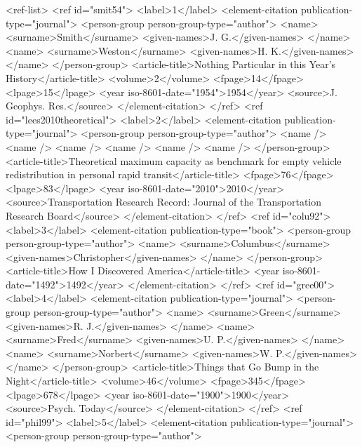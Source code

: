 <ref-list>
  <ref id="smit54">
    <label>1</label>
    <element-citation publication-type="journal">
      <person-group person-group-type="author">
        <name>
          <surname>Smith</surname>
          <given-names>J. G.</given-names>
        </name>
        <name>
          <surname>Weston</surname>
          <given-names>H. K.</given-names>
        </name>
      </person-group>
      <article-title>Nothing Particular in this Year's History</article-title>
      <volume>2</volume>
      <fpage>14</fpage>
      <lpage>15</lpage>
      <year iso-8601-date="1954">1954</year>
      <source>J. Geophys. Res.</source>
    </element-citation>
  </ref>
  <ref id="lees2010theoretical">
    <label>2</label>
    <element-citation publication-type="journal">
      <person-group person-group-type="author">
        <name />
        <name />
        <name />
        <name />
        <name />
        <name />
      </person-group>
      <article-title>Theoretical maximum capacity as benchmark for empty vehicle redistribution in personal rapid transit</article-title>
      <fpage>76</fpage>
      <lpage>83</lpage>
      <year iso-8601-date="2010">2010</year>
      <source>Transportation Research Record: Journal of the Transportation Research Board</source>
    </element-citation>
  </ref>
  <ref id="colu92">
    <label>3</label>
    <element-citation publication-type="book">
      <person-group person-group-type="author">
        <name>
          <surname>Columbus</surname>
          <given-names>Christopher</given-names>
        </name>
      </person-group>
      <article-title>How {I} Discovered {America}</article-title>
      <year iso-8601-date="1492">1492</year>
    </element-citation>
  </ref>
  <ref id="gree00">
    <label>4</label>
    <element-citation publication-type="journal">
      <person-group person-group-type="author">
        <name>
          <surname>Green</surname>
          <given-names>R. J.</given-names>
        </name>
        <name>
          <surname>Fred</surname>
          <given-names>U. P.</given-names>
        </name>
        <name>
          <surname>Norbert</surname>
          <given-names>W. P.</given-names>
        </name>
      </person-group>
      <article-title>Things that Go Bump in the Night</article-title>
      <volume>46</volume>
      <fpage>345</fpage>
      <lpage>678</lpage>
      <year iso-8601-date="1900">1900</year>
      <source>Psych. Today</source>
    </element-citation>
  </ref>
  <ref id="phil99">
    <label>5</label>
    <element-citation publication-type="journal">
      <person-group person-group-type="author">
